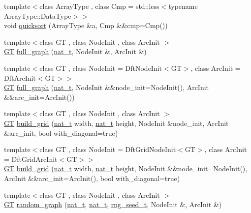 \begin{DoxyCompactItemize}
\item 
{\footnotesize template$<$class Array\+Type , class Cmp  = std\+::less$<$typename Array\+Type\+::\+Data\+Type$>$$>$ }\\void \hyperlink{namespace_designar_a75b9270f723888eb32e0b8f78032f0df}{quicksort} (Array\+Type \&a, Cmp \&\&cmp=Cmp())
\item 
{\footnotesize template$<$class GT , class Node\+Init , class Arc\+Init $>$ }\\\hyperlink{demo-buildgraph_8_c_a3001c40d2c31ca87ed96cd7d1334a55e}{GT} \hyperlink{namespace_designar_a8d424cb12f90b415f71463d919979437}{full\+\_\+graph} (\hyperlink{namespace_designar_aa72662848b9f4815e7bf31a7cf3e33d1}{nat\+\_\+t}, Node\+Init \&, Arc\+Init \&)
\item 
{\footnotesize template$<$class GT , class Node\+Init  = Dft\+Node\+Init$<$\+G\+T$>$, class Arc\+Init  = Dft\+Arc\+Init$<$\+G\+T$>$$>$ }\\\hyperlink{demo-buildgraph_8_c_a3001c40d2c31ca87ed96cd7d1334a55e}{GT} \hyperlink{namespace_designar_aa06a68f735d6f8086fe2c5f4cd8062f1}{full\+\_\+graph} (\hyperlink{namespace_designar_aa72662848b9f4815e7bf31a7cf3e33d1}{nat\+\_\+t}, Node\+Init \&\&node\+\_\+init=Node\+Init(), Arc\+Init \&\&arc\+\_\+init=Arc\+Init())
\item 
{\footnotesize template$<$class GT , class Node\+Init , class Arc\+Init $>$ }\\\hyperlink{demo-buildgraph_8_c_a3001c40d2c31ca87ed96cd7d1334a55e}{GT} \hyperlink{namespace_designar_aec5eb60a497214494947086c4cd7af76}{build\+\_\+grid} (\hyperlink{namespace_designar_aa72662848b9f4815e7bf31a7cf3e33d1}{nat\+\_\+t} width, \hyperlink{namespace_designar_aa72662848b9f4815e7bf31a7cf3e33d1}{nat\+\_\+t} height, Node\+Init \&node\+\_\+init, Arc\+Init \&arc\+\_\+init, bool with\+\_\+diagonal=true)
\item 
{\footnotesize template$<$class GT , class Node\+Init  = Dft\+Grid\+Node\+Init$<$\+G\+T$>$, class Arc\+Init  = Dft\+Grid\+Arc\+Init$<$\+G\+T$>$$>$ }\\\hyperlink{demo-buildgraph_8_c_a3001c40d2c31ca87ed96cd7d1334a55e}{GT} \hyperlink{namespace_designar_a57d0b4318f5ae1ef0082a67d7eeb10fe}{build\+\_\+grid} (\hyperlink{namespace_designar_aa72662848b9f4815e7bf31a7cf3e33d1}{nat\+\_\+t} width, \hyperlink{namespace_designar_aa72662848b9f4815e7bf31a7cf3e33d1}{nat\+\_\+t} height, Node\+Init \&\&node\+\_\+init=Node\+Init(), Arc\+Init \&\&arc\+\_\+init=Arc\+Init(), bool with\+\_\+diagonal=true)
\item 
{\footnotesize template$<$class GT , class Node\+Init , class Arc\+Init $>$ }\\\hyperlink{demo-buildgraph_8_c_a3001c40d2c31ca87ed96cd7d1334a55e}{GT} \hyperlink{namespace_designar_aee2e3d201a649a468dbe1def58fd285a}{random\+\_\+graph} (\hyperlink{namespace_designar_aa72662848b9f4815e7bf31a7cf3e33d1}{nat\+\_\+t}, \hyperlink{namespace_designar_aa72662848b9f4815e7bf31a7cf3e33d1}{nat\+\_\+t}, \hyperlink{namespace_designar_ad621b5646d45288c5d6a1e1dfe7531a8}{rng\+\_\+seed\+\_\+t}, Node\+Init \&, Arc\+Init \&)

\end{DoxyCompactItemize}
